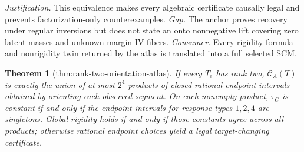 \documentclass{article}
\newtheorem{theorem}{Theorem}
\begin{document}
\par\smallskip\noindent \textit{Justification.} This equivalence makes every algebraic certificate causally legal and prevents factorization-only counterexamples. \textit{Gap.} The anchor proves recovery under regular inversions but does not state an onto nonnegative lift covering zero latent masses and unknown-margin IV fibers. \textit{Consumer.} Every rigidity formula and nonrigidity twin returned by the atlas is translated into a full selected SCM.

\begin{theorem}[thm:rank-two-orientation-atlas]\label{thm:rank-two-orientation-atlas}
If every \(T_e\) has rank two, \(\mathcal C_A(T)\) is exactly the union of at most \(2^4\) products of closed rational endpoint intervals obtained by orienting each observed segment. On each nonempty product, \(\tau_C\) is constant if and only if the endpoint intervals for response types \(1,2,4\) are singletons. Global rigidity holds if and only if those constants agree across all products; otherwise rational endpoint choices yield a legal target-changing certificate.
\end{theorem}
\end{document}
